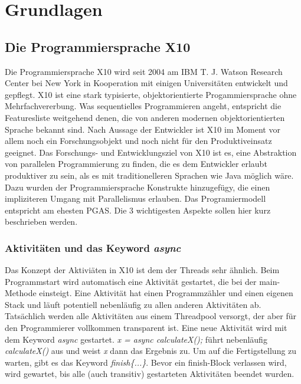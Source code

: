 \chapter{Grundlagen} %
\label{cha:grundlagen}

\section{Die Programmiersprache X10} %
\label{sec:die_programmiersprache_x10}
Die Programmiersprache X10 wird seit 2004 am IBM T. J. Watson Research Center bei New York in Kooperation mit einigen Universitäten entwickelt und gepflegt. X10 ist eine stark typisierte, objektorientierte Progammiersprache ohne Mehrfachvererbung. Was sequentielles Programmieren angeht, entspricht die Featuresliste weitgehend denen, die von anderen modernen objektorientierten Sprache bekannt sind. Nach Aussage der Entwickler ist X10 im Moment vor allem noch ein Forschungsobjekt und noch nicht für den Produktiveinsatz geeignet. Das Forschungs- und Entwicklungsziel von X10 ist es, eine Abstraktion von parallelen Programmierung zu finden, die es dem Entwickler erlaubt produktiver zu sein, als es mit traditionelleren Sprachen wie Java möglich wäre. Dazu wurden der Programmiersprache Konstrukte hinzugefügy, die einen impliziteren Umgang mit Parallelismus erlauben. Das Programiermodell entspricht am ehesten PGAS. Die 3 wichtigesten Aspekte sollen hier kurz beschrieben werden.\cite{x10FAQ:2012:Online}

\subsection{Aktivitäten und das Keyword \textit{async}}  %
\label{sub:aktivitaeten_und_das_keyword_async}
Das Konzept der Aktiviäten in X10 ist dem der Threads sehr ähnlich. Beim Programmstart wird automatisch eine Aktivität gestartet, die bei der main-Methode einsteigt. Eine Aktivität hat einen Programmzähler und einen eigenen Stack und läuft potentiell nebenläufig zu allen anderen Aktivitäten ab. Tatsächlich werden alle Aktivitäten aus einem Threadpool versorgt, der aber für den Programmierer vollkommen transparent ist. Eine neue Aktivität wird mit dem Keyword \textit{async} gestartet. \textit{ x = async calculateX();} führt nebenläufig \textit{calculateX()} aus und weist \textit{x} dann das Ergebnis zu. Um auf die Fertigstellung zu warten, gibt es das Keyword \textit{finish\{...\}}. Bevor ein finish-Block verlassen wird, wird gewartet, bis alle (auch transitiv) gestarteten Aktivitäten beendet wurden.\cite{x10Spec:2012:Online}

